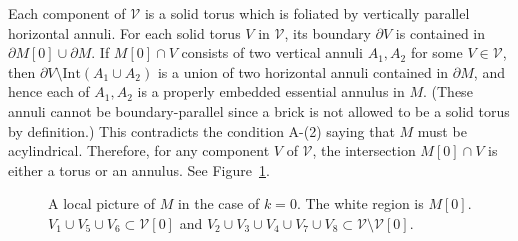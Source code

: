 \documentclass{amsart}
\theoremstyle{definition}
\numberwithin{figure}{section}
\numberwithin{equation}{section}
\def\cv{\mathcal{V}}
\def\part{\partial}
\def\Int{\mathrm{Int}}
\begin{document}
Each component of $\cv$ is a  solid torus which is foliated by vertically parallel horizontal annuli.
For each solid torus $V$ in $\cv$, its boundary $\partial V$ is contained in $\partial M[0] \cup \partial M$.
If $M[0]\cap V$ consists of two vertical annuli $A_1,A_2$ for some $V\in \cv$, then 
$\part V\setminus \Int (A_1\cup A_2)$ is a union of two horizontal annuli contained in $\part M$, and 
hence each of $A_1,A_2$ is a properly embedded essential annulus in $M$.
(These annuli cannot be boundary-parallel since a brick is not allowed to be a solid torus by definition.)
This contradicts the condition A-(2) saying that $M$ must be acylindrical.
Therefore, for any component $V$ of $\cv$, the intersection $M[0]\cap V$ is either a torus or an annulus.
 See Figure\ \ref{fig2_6}. 
\begin{figure}[hbtp]
\centering
{}
\caption{A local picture of $M$ in the case of $k=0$.
The white region is $M[0]$.
$V_1\cup V_5\cup V_6\subset \cv[0]$ and $V_2\cup V_3\cup V_4\cup V_7\cup V_8\subset \cv\setminus \cv[0]$.}
\label{fig2_6}
\end{figure}
\end{document}
